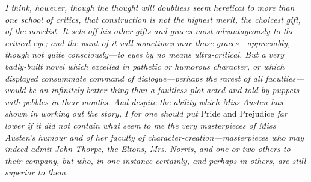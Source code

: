 \textit{I think, however, though the thought will doubtless seem heretical to more than one school of critics, that construction is not the highest merit, the choicest gift, of the novelist. It sets off his other gifts and graces most advantageously to the critical eye; and the want of it will sometimes mar those graces---appreciably, though not quite consciously---to eyes by no means ultra-critical. But a very badly-built novel which excelled in pathetic or humorous character, or which displayed consummate command of dialogue---perhaps the rarest of all faculties---would be an infinitely better thing than a faultless plot acted and told by puppets with pebbles in their mouths. And despite the ability which Miss Austen has shown in working out the story, I for one should put} Pride and Prejudice \textit{far lower if it did not contain what seem to me the very masterpieces of Miss Austen's humour and of her faculty of character-creation---masterpieces who may indeed admit John Thorpe, the Eltons, Mrs. Norris, and one or two others to their company, but who, in one instance certainly, and perhaps in others, are still superior to them.}

